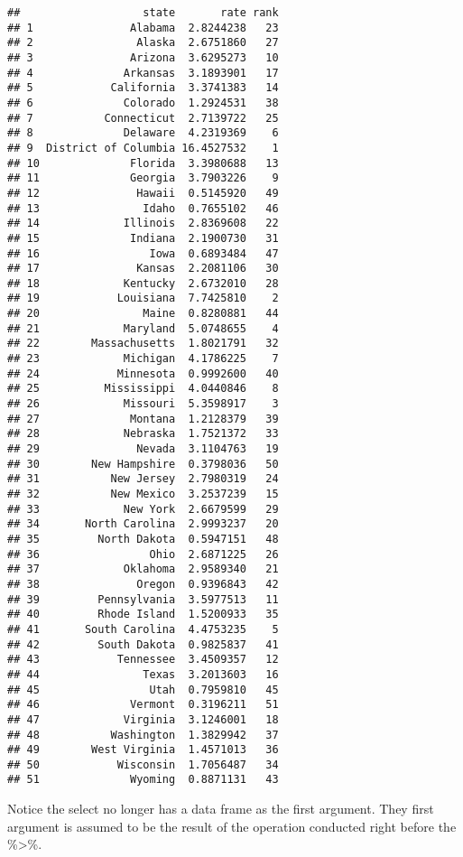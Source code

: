 \documentclass[
]{article}
\begin{document}
\begin{verbatim}
##                   state       rate rank
## 1               Alabama  2.8244238   23
## 2                Alaska  2.6751860   27
## 3               Arizona  3.6295273   10
## 4              Arkansas  3.1893901   17
## 5            California  3.3741383   14
## 6              Colorado  1.2924531   38
## 7           Connecticut  2.7139722   25
## 8              Delaware  4.2319369    6
## 9  District of Columbia 16.4527532    1
## 10              Florida  3.3980688   13
## 11              Georgia  3.7903226    9
## 12               Hawaii  0.5145920   49
## 13                Idaho  0.7655102   46
## 14             Illinois  2.8369608   22
## 15              Indiana  2.1900730   31
## 16                 Iowa  0.6893484   47
## 17               Kansas  2.2081106   30
## 18             Kentucky  2.6732010   28
## 19            Louisiana  7.7425810    2
## 20                Maine  0.8280881   44
## 21             Maryland  5.0748655    4
## 22        Massachusetts  1.8021791   32
## 23             Michigan  4.1786225    7
## 24            Minnesota  0.9992600   40
## 25          Mississippi  4.0440846    8
## 26             Missouri  5.3598917    3
## 27              Montana  1.2128379   39
## 28             Nebraska  1.7521372   33
## 29               Nevada  3.1104763   19
## 30        New Hampshire  0.3798036   50
## 31           New Jersey  2.7980319   24
## 32           New Mexico  3.2537239   15
## 33             New York  2.6679599   29
## 34       North Carolina  2.9993237   20
## 35         North Dakota  0.5947151   48
## 36                 Ohio  2.6871225   26
## 37             Oklahoma  2.9589340   21
## 38               Oregon  0.9396843   42
## 39         Pennsylvania  3.5977513   11
## 40         Rhode Island  1.5200933   35
## 41       South Carolina  4.4753235    5
## 42         South Dakota  0.9825837   41
## 43            Tennessee  3.4509357   12
## 44                Texas  3.2013603   16
## 45                 Utah  0.7959810   45
## 46              Vermont  0.3196211   51
## 47             Virginia  3.1246001   18
## 48           Washington  1.3829942   37
## 49        West Virginia  1.4571013   36
## 50            Wisconsin  1.7056487   34
## 51              Wyoming  0.8871131   43
\end{verbatim}

Notice the select no longer has a data frame as the first argument. They
first argument is assumed to be the result of the operation conducted
right before the \%\textgreater\%.
\end{document}
